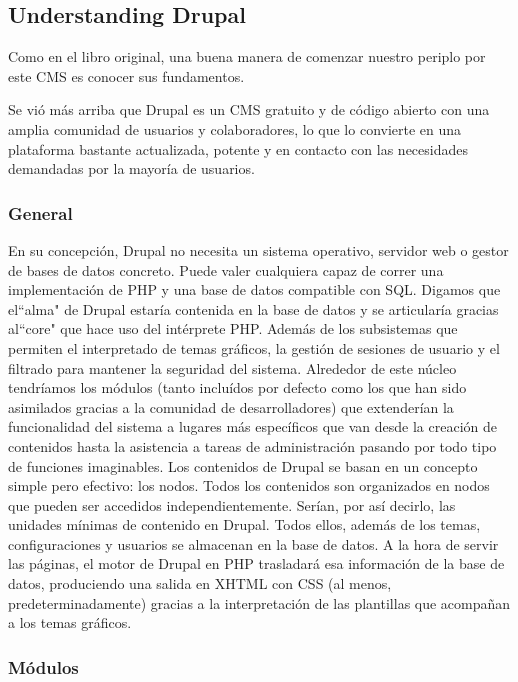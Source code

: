 \subsection{Understanding Drupal}

\par Como en el libro original, una buena manera de comenzar nuestro periplo por este CMS es conocer sus fundamentos.
\par Se vió más arriba que Drupal es un CMS gratuito y de código abierto con una amplia comunidad de usuarios y colaboradores, lo que lo convierte en una plataforma bastante actualizada, potente y en contacto con las necesidades demandadas por la mayoría de usuarios.

\subsubsection{General} 

\par En su concepción, Drupal no necesita un sistema operativo, servidor web o gestor de bases de datos concreto. Puede valer cualquiera capaz de correr una implementación de PHP y una base de datos compatible con SQL. Digamos que el``alma" de Drupal estaría contenida en la base de datos y se articularía gracias al``core" que hace uso del intérprete PHP. Además de los subsistemas que permiten el interpretado de temas gráficos, la gestión de sesiones de usuario y el filtrado para mantener la seguridad del sistema. Alrededor de este núcleo tendríamos los módulos (tanto incluídos por defecto como los que han sido asimilados gracias a la comunidad de desarrolladores) que extenderían la funcionalidad del sistema a lugares más específicos que van desde la creación de contenidos hasta la asistencia a tareas de administración pasando por todo tipo de funciones imaginables.
Los contenidos de Drupal se basan en un concepto simple pero efectivo: los nodos. Todos los contenidos son organizados en nodos que pueden ser accedidos independientemente. Serían, por así decirlo, las unidades mínimas de contenido en Drupal. Todos ellos, además de los temas, configuraciones y usuarios se almacenan en la base de datos. A la hora de servir las páginas, el motor de Drupal en PHP trasladará esa información de la base de datos, produciendo una salida en XHTML con CSS (al menos, predeterminadamente) gracias a la interpretación de las plantillas que acompañan a los temas gráficos.

\subsubsection{Módulos} 

